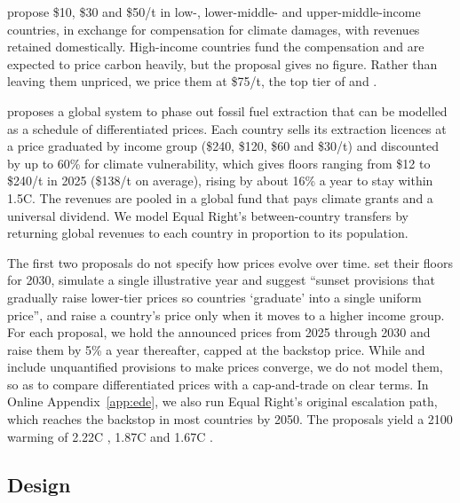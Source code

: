 \documentclass[12pt,english]{article}
\theoremstyle{remark}
\begin{document}
\citet{banerjee_grand_2025} propose \$10, \$30 and \$50/t in low-, lower-middle- and upper-middle-income countries, in exchange for compensation for climate damages, with revenues retained domestically. High-income countries fund the compensation and are expected to price carbon heavily, but the proposal gives no figure. Rather than leaving them unpriced, we price them at \$75/t, the top tier of \citet{parry_proposal_2021} and \citet{wolfram_building_2025}.

\citet{equal_right_climate_2023} proposes a global system to phase out fossil fuel extraction that can be modelled as a schedule of differentiated prices.
Each country sells its extraction licences at a price graduated by income group (\$240, \$120, \$60 and \$30/t) and discounted by up to 60\% for climate vulnerability, which gives floors ranging from \$12 to \$240/t in 2025 (\$138/t on average), rising by about 16\% a year to stay within 1.5\textdegree C.
The revenues are pooled in a global fund that pays climate grants and a universal dividend. We model Equal Right's between-country transfers by returning global revenues to each country in proportion to its population.

The first two proposals do not specify how prices evolve over time. \citet{parry_proposal_2021} set their floors for 2030, \citet{wolfram_building_2025} simulate a single illustrative year and suggest ``sunset provisions that gradually raise lower-tier prices so countries `graduate' into a single uniform price'', and \citet{banerjee_grand_2025} raise a country's price only when it moves to a higher income group.
For each proposal, we hold the announced prices from 2025 through 2030 and raise them by 5\% a year thereafter, capped at the backstop price.
While \cite{wolfram_building_2025} and \citet{banerjee_grand_2025} include unquantified provisions to make prices converge, we do not model them, so as to compare differentiated prices with a cap-and-trade on clear terms. In Online Appendix~\ref{app:ede}, we also run Equal Right's original escalation path, which reaches the backstop in most countries by 2050.
The proposals yield a 2100 warming of 2.22\textdegree C \citep{wolfram_building_2025}, 1.87\textdegree C \citep{banerjee_grand_2025} and 1.67\textdegree C \citep{equal_right_climate_2023}.

\subsection{Design}
\end{document}
